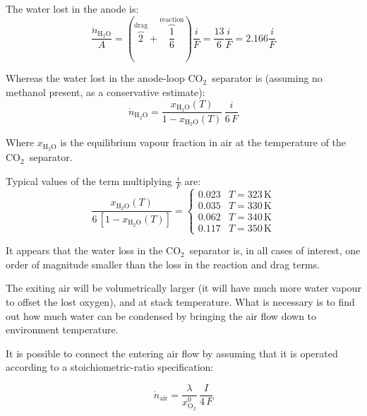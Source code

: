 \documentclass[a4paper,10pt]{article}
\newcommand{\HHO}{\ensuremath{\mathrm{H_2O}}}
\newcommand{\OO}{\ensuremath{\mathrm{O_2}}}
\newcommand{\COO}{\ensuremath{\mathrm{CO_2}}}
\begin{document}
The water lost in the anode is:
\begin{equation}
\frac{\dot n_\HHO}{A} = \left( \overbrace{2}^\text{drag} +
\overbrace{\frac{1}{6}}^\text{reaction} \right) \frac{i}{F}=
\frac{13}{6}\frac{i}{F} = 2.166 \frac{i}{F}
\end{equation}

Whereas the water lost in the anode-loop \COO\ separator is (assuming no
methanol present, as a conservative estimate):
\begin{equation}
\dot n_\HHO = \frac{x_\HHO(T)}{1-x_\HHO(T)}\,\frac{i}{6\,F}
\end{equation}

Where $x_\HHO$ is the equilibrium vapour fraction in air at the temperature
of the \COO\ separator.

Typical values of the term multiplying $\frac{i}{F}$ are:
\begin{equation}
\frac{x_\HHO(T)}{6\,[1-x_\HHO(T)]} =
\begin{cases}
0.023 & T = 323\,\mathrm{K}\\
0.035 & T = 330\,\mathrm{K}\\
0.062 & T = 340\,\mathrm{K}\\
0.117 & T = 350\,\mathrm{K}
\end{cases}
\end{equation}

It appears that the water loss in the \COO\ separator is, in all cases of
interest, one order of magnitude smaller than the loss in the reaction and
drag terms.

The exiting air will be volumetrically larger (it will have much more water
vapour to offset the lost oxygen), and at stack temperature. What is necessary
is to find out how much water can be condensed by bringing the air flow down to
environment temperature.

It is possible to connect the entering air flow by assuming that it is operated
according to a stoichiometric-ratio specification:

\begin{equation}
\dot n_\text{air} = \frac{\lambda}{x_\OO^0}\, \frac{I}{4\,F}
\end{equation}
\end{document}
